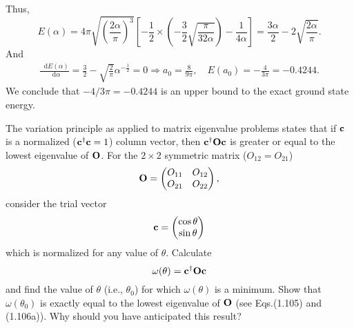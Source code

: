 \documentclass[a4paper]{book}
\newcounter{exercise}[chapter]
\newcounter{solution}[chapter]
\newcommand*{\dif}{\mathop{}\!\mathrm{d}}
\newcommand{\Op}{{\bf O}}
\begin{document}
\begin{solution}
	Thus,
	\[
		E( \alpha ) = 4\pi \sqrt{ \left( \frac{2\alpha}{\pi} \right)^3 } \left[ -\frac{1}{2} \times \left( - \frac{3}{2} \sqrt{ \frac{ \pi }{ 32 \alpha } } \right) - \frac{1}{4\alpha} \right] = \frac{ 3 \alpha }{ 2 } - 2 \sqrt{ \frac{ 2\alpha }{ \pi } } .
	\]
	And
	\begin{align*}
		\frac{ \dif E( \alpha ) }{ \dif \alpha } = \frac{3}{2} -  \sqrt{ \frac{2}{\pi} } \alpha^{-\frac{1}{2}} = 0 \Rightarrow a_0 = \frac{ 8 }{ 9\pi } , \quad E( a_0 ) = - \frac{4}{3\pi} = -0.4244 .
	\end{align*}
	We conclude that $-4/3\pi = -0.4244$ is an upper bound to the exact ground state energy.
	
	\end{solution}
	
	\begin{exercise}
	The variation principle as applied to matrix eigenvalue problems states that if ${\bf c}$ is a normalized (${\bf c}^\dagger {\bf c}=1$) column vector, then ${\bf c}^\dagger\Op{\bf c}$ is greater or equal to the lowest eigenvalue of $\Op$. For the $2\times2$ symmetric matrix ($O_{12}=O_{21}$)
	\[
		\Op = \begin{pmatrix} O_{11} & O_{12} \\ O_{21} & O_{22} \end{pmatrix},
	\]
	consider the trial vector
	\[
		{\bf c} = \begin{pmatrix} \cos\theta \\ \sin\theta \end{pmatrix}
	\]
	which is normalized for any value of $\theta$. Calculate
	\[
		\omega(\theta) = {\bf c}^\dagger \Op {\bf c}
	\]
	and find the value of $\theta$ (i.e., $\theta_0$) for which $\omega(\theta)$ is a minimum. Show that $\omega(\theta_0)$ is exactly equal to the lowest eigenvalue of $\Op$ (see Eqs.(1.105) and (1.106a)). Why should you have anticipated this result?
	\end{exercise}
	
\end{document}
